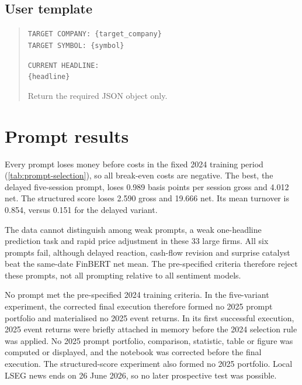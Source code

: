 \subsection*{User template}

\begin{quote}\small
\texttt{TARGET COMPANY: \{target\_company\}}\\
\texttt{TARGET SYMBOL: \{symbol\}}

\texttt{CURRENT HEADLINE:}\\
\texttt{\{headline\}}

Return the required JSON object only.
\end{quote}

\section{Prompt results}


\FloatBarrier

Every prompt loses money before costs in the fixed 2024 training period
(\cref{tab:prompt-selection}), so all break-even costs are negative. The best,
the delayed five-session prompt, loses 0.989 basis points per session gross and
4.012 net. The structured score loses 2.590 gross and 19.666 net. Its mean
turnover is 0.854, versus 0.151 for the delayed variant.

The data cannot distinguish among weak prompts, a weak one-headline prediction
task and rapid price adjustment in these 33 large firms. All six prompts fail,
although delayed reaction, cash-flow revision and surprise catalyst beat the
same-date FinBERT net mean. The pre-specified criteria therefore reject these
prompts, not all prompting relative to all sentiment models.

No prompt met the pre-specified 2024 training criteria. In the five-variant
experiment, the corrected final execution therefore formed no 2025 prompt
portfolio and materialised no 2025 event returns. In its first successful
execution, 2025 event returns were briefly attached in memory before the 2024
selection rule was applied. No 2025 prompt portfolio, comparison, statistic,
table or figure was computed or displayed, and the notebook was corrected before
the final execution. The structured-score experiment also formed no 2025
portfolio. Local LSEG news ends on 26 June 2026, so no later prospective test was
possible.

